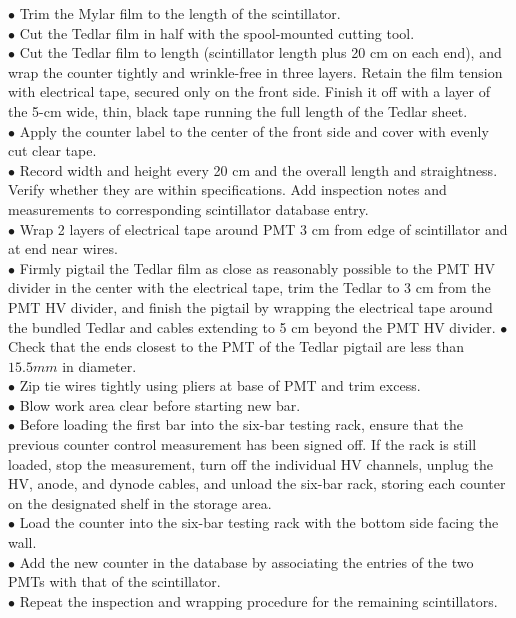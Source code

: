 $\bullet$ Trim the Mylar film to the length of the scintillator.\\
$\bullet$ Cut the Tedlar film in half with the spool-mounted cutting tool.\\
$\bullet$ Cut the Tedlar film to length (scintillator length plus 20 cm on each end), and
wrap the counter tightly and wrinkle-free in three layers. Retain the film
tension with electrical tape, secured only on the front side. Finish it off with a
layer of the 5-cm wide, thin, black tape running the full length of the Tedlar
sheet.\\
$\bullet$ Apply the counter label to the center of the front side and cover with evenly cut
clear tape.\\
$\bullet$ Record width and height every 20 cm and the overall length and straightness.
Verify whether they are within specifications. Add inspection notes and
measurements to corresponding scintillator database entry.\\
$\bullet$ Wrap 2 layers of electrical tape around PMT 3 cm from edge of scintillator
and at end near wires.\\
$\bullet$ Firmly pigtail the Tedlar film as close as reasonably possible to the PMT HV
divider in the center with the electrical tape, trim the Tedlar to 3 cm from the
PMT HV divider, and finish the pigtail by wrapping the electrical tape around
the bundled Tedlar and cables extending to 5 cm beyond the PMT HV divider.
$\bullet$ Check that the ends closest to the PMT of the Tedlar pigtail are less than
$15.5mm$ in diameter.\\
$\bullet$ Zip tie wires tightly using pliers at base of PMT and trim excess.\\
$\bullet$ Blow work area clear before starting new bar.\\
$\bullet$ Before loading the first bar into the six-bar testing rack, ensure that the previous
counter control measurement has been signed off. If the rack is still loaded,
stop the measurement, turn off the individual HV channels, unplug the HV,
anode, and dynode cables, and unload the six-bar rack, storing each counter on
the designated shelf in the storage area.\\
$\bullet$ Load the counter into the six-bar testing rack with the bottom side facing the
wall.\\
$\bullet$ Add the new counter in the database by associating the entries of the two PMTs
with that of the scintillator.\\
$\bullet$ Repeat the inspection and wrapping procedure for the remaining scintillators.

